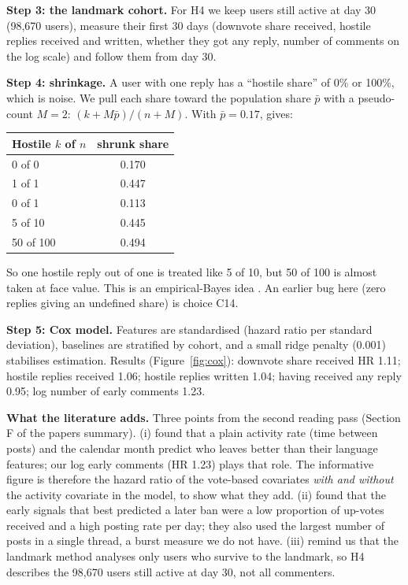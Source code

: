 

\textbf{Step 3: the landmark cohort.} For H4 we keep users still active at day 30 (98,670 users), measure their first 30 days (downvote share received, hostile replies received and written, whether they got any reply, number of comments on the log scale) and follow them from day 30.

\textbf{Step 4: shrinkage.} A user with one reply has a ``hostile share'' of 0\% or 100\%, which is noise. We pull each share toward the population share $\bar p$ with a pseudo-count $M=2$: $(k+M\bar p)/(n+M)$. With $\bar p=0.17$,  gives:
\begin{center}
\begin{tabular}{@{}lc@{}}
\toprule
Hostile $k$ of $n$ & shrunk share \\
\midrule
0 of 0 & 0.170 \\
1 of 1 & 0.447 \\
0 of 1 & 0.113 \\
5 of 10 & 0.445 \\
50 of 100 & 0.494 \\
\bottomrule
\end{tabular}
\end{center}
So one hostile reply out of one is treated like 5 of 10, but 50 of 100 is almost taken at face value. This is an empirical-Bayes idea . An earlier bug here (zero replies giving an undefined share) is choice C14.

\textbf{Step 5: Cox model.} Features are standardised (hazard ratio per standard deviation), baselines are stratified by cohort, and a small ridge penalty (0.001) stabilises estimation. Results (Figure~\ref{fig:cox}): downvote share received HR 1.11; hostile replies received 1.06; hostile replies written 1.04; having received any reply 0.95; log number of early comments 1.23.

\textbf{What the literature adds.} Three points from the second reading pass (Section F of the papers summary). (i)  found that a plain activity rate (time between posts) and the calendar month predict who leaves better than their language features; our log early comments (HR 1.23) plays that role. The informative figure is therefore the hazard ratio of the vote-based covariates \emph{with and without} the activity covariate in the model, to show what they add. (ii)  found that the early signals that best predicted a later ban were a low proportion of up-votes received and a high posting rate per day; they also used the largest number of posts in a single thread, a burst measure we do not have. (iii)  remind us that the landmark method analyses only users who survive to the landmark, so H4 describes the 98,670 users still active at day 30, not all commenters.

